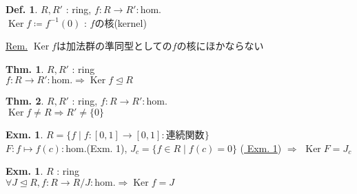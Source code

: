 \documentclass[uplatex,dvipdfmx,9pt]{beamer}
\newcommand{\inverse}[1]{#1^{-1}}
\newcommand{\Ker}{\operatorname{Ker}}
\newcommand{\ideal}{\trianglelefteq}
\renewcommand{\hom}{\text{hom.}} %
\newcounter{textExmCount}
\theoremstyle{definition} %
\newtheorem{defn}{Def.}[subsection] %
\newtheorem{thm}{Thm.}[subsection] %
\theoremstyle{example}
\newtheorem{exmText}[textExmCount]{Exm.}
\begin{document}
    \begin{frame}
      
      \begin{defn}
        $R, R'$ : ring, $f\colon R \to R' : \hom$ \\
        $\Ker f \coloneqq \inverse{f}(0)$ : $f$の\alert{核(kernel)}
      \end{defn}
      \underline{Rem.} $\Ker f$は加法群の準同型としての$f$の核にほかならない

      \begin{thm}
        $R, R'$ : ring \\
        $f\colon R \to R' : \hom \Rightarrow \Ker f \ideal R$
      \end{thm}

      \begin{thm}
        $R, R'$ : ring, $f\colon R \to R' : \hom$ \\
        $\Ker f \neq R \Rightarrow R'\neq \{0\} $
      \end{thm}

    \end{frame}

    \begin{frame}

      \begin{exmText}
        $R = \{f \mid f\colon [0, 1] \to [0, 1] : \text{連続関数}\}$ \\
        $F\colon f \mapsto f(c) : \hom$(Exm. 1), $J_c = \{f \in R \mid f(c) = 0\}$ (\hyperlink{exmText3-1}{ Exm. 1}) $\Rightarrow$ $\Ker F = J_c$
      \end{exmText}

      \begin{exmText}
        $R$ : ring \\
        $\forall J \ideal R, f\colon R \to R/J : \hom \Rightarrow \Ker f = J$
      \end{exmText}
      
    \end{frame}
\end{document}
